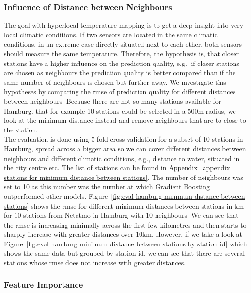\subsubsection{Influence of Distance between Neighbours}

The goal with hyperlocal temperature mapping is to get a deep insight into very local climatic conditions. If two sensors are located in the same climatic conditions, in an extreme case directly situated next to each other, both sensors should measure the same temperature. Therefore, the hypothesis is, that closer stations have a higher influence on the prediction quality, e.g., if closer stations are chosen as neighbours the prediction quality is better compared than if the same number of neighbours is chosen but further away. We investigate this hypotheses by comparing the \gls{rmse} of prediction quality for different distances between neighbours. Because there are not so many stations available for Hamburg, that for example 10 stations could be selected in a 500m radius, we look at the minimum distance instead and remove neighbours that are to close to the station.\\
The evaluation is done using 5-fold cross validation for a subset of 10 stations in Hamburg, spread across a bigger area so we can cover different distances between neighbours and different climatic conditions, e.g., distance to water, situated in the city centre etc. The list of stations can be found in Appendix~\ref{appendix stations for minimum distance between stations}. The number of neighbours was set to 10 as this number was the number at which Gradient Boosting outperformed other models. Figure~\ref{fig:eval hamburg minimum distance between stations} shows the \gls{rmse} for different minimum distances between stations in km for 10 stations from Netatmo in Hamburg with 10 neighbours. We can see that the \gls{rmse} is increasing minimally across the first few kilometres and then starts to sharply increase with greater distances over 10km. However, if we take a look at Figure~\ref{fig:eval hamburg minimum distance between stations by station id} which shows the same data but grouped by station id, we can see that there are several stations whose \gls{rmse} does not increase with greater distances.\\ %

\subsubsection{Feature Importance}


